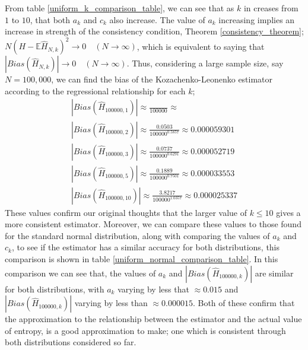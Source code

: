 \documentclass{article}
\begin{document}
From table \ref{uniform_k_comparison_table}, we can see that as $k$ in creases from $1$ to $10$, that both $a_{k}$ and $c_{k}$ also increase. The value of $a_{k}$ increasing implies an increase in strength of the consistency condition, Theorem \ref{consistency_theorem};  $N (H - \mathbb{E}{\hat{H}_{N, k}})^2 \to 0 \quad  (N \to \infty)$, which is equivalent to saying that $|Bias(\hat{H}_{N, k})| \to 0 \quad (N \to \infty)$. Thus, considering a large sample size, say $N=100,000$, we can find the bias of the Kozachenko-Leonenko estimator according to the regressional relationship for each $k$;
\begin{gather*}
|Bias(\hat{H}_{100000, 1})| \approx  \frac{}{100000^{}}   \approx  \\
|Bias(\hat{H}_{100000, 2})| \approx  \frac{0.0503}{100000^{0.5857}}   \approx 0.000059301 \\
|Bias(\hat{H}_{100000, 3})| \approx  \frac{0.0737}{100000^{0.6291}}   \approx 0.000052719 \\
|Bias(\hat{H}_{100000, 5})| \approx  \frac{0.1889}{100000^{0.7501}}   \approx 0.000033553\\
|Bias(\hat{H}_{100000, 10})| \approx  \frac{3.8217}{100000^{1.0357}}  \approx 0.000025337
\end{gather*}
These values confirm our original thoughts that the larger value of $k \leq 10$ gives a more consistent estimator. Moreover, we can compare these values to those found for the standard normal distribution, along with comparing the values of $a_{k}$ and $c_{k}$, to see if the estimator has a similar accuracy for both distributions, this comparison is shown in table \ref{uniform_normal_comparison_table}.
In this comparison we can see that, the values of $a_{k}$ and $|Bias(\hat{H}_{100000, k})|$ are similar for both distributions, with $a_{k}$ varying by less that $\approx 0.015$ and $|Bias(\hat{H}_{100000, k})|$ varying by less than $\approx 0.000015$. Both of these confirm that the approximation to the relationship between the estimator and the actual value of entropy, is a good approximation to make; one which is consistent through both distributions considered so far.
\end{document}
